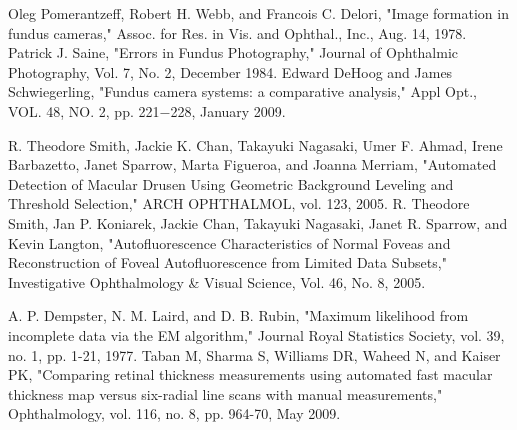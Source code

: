 \begin{thebibliography}{300}
 Oleg Pomerantzeff, Robert H. Webb, and Francois C. Delori, "Image formation in fundus cameras," Assoc. for Res. in Vis. and Ophthal., Inc., Aug. 14, 1978.
 Patrick J. Saine, "Errors in Fundus Photography," Journal of Ophthalmic Photography, Vol. 7, No. 2, December 1984.
 Edward DeHoog and James Schwiegerling, "Fundus camera systems: a comparative analysis," Appl Opt., VOL. 48, NO. 2, pp. 221$-$228, January 2009.

 R. Theodore Smith, Jackie K. Chan, Takayuki Nagasaki, Umer F. Ahmad, Irene Barbazetto, Janet Sparrow, Marta Figueroa, and Joanna Merriam, "Automated Detection of Macular Drusen Using Geometric Background Leveling and Threshold Selection," ARCH OPHTHALMOL, vol. 123, 2005.
 R. Theodore Smith, Jan P. Koniarek, Jackie Chan, Takayuki Nagasaki, Janet R. Sparrow, and Kevin Langton, "Autofluorescence Characteristics of Normal Foveas and Reconstruction of Foveal Autofluorescence from Limited Data Subsets," Investigative Ophthalmology \& Visual Science, Vol. 46, No. 8, 2005.

 A. P. Dempster, N. M. Laird, and D. B. Rubin, "Maximum likelihood from incomplete data via the EM algorithm," Journal Royal Statistics Society, vol. 39, no. 1, pp. 1-21, 1977.
 Taban M, Sharma S, Williams DR, Waheed N, and Kaiser PK, "Comparing retinal thickness measurements using automated fast macular thickness map versus six-radial line scans with manual measurements," Ophthalmology, vol. 116, no. 8, pp. 964-70, May 2009.


\end{thebibliography}

%
%
%
%
\newpage

